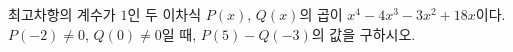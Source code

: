 최고차항의 계수가 $1$인 두 이차식 $P(x)$, $Q(x)$의 곱이 $x^4-4x^3-3x^2+18x$이다. $P(-2)\ne 0$, $Q(0)\ne 0$일 때, $P(5)-Q(-3)$의 값을 구하시오.
